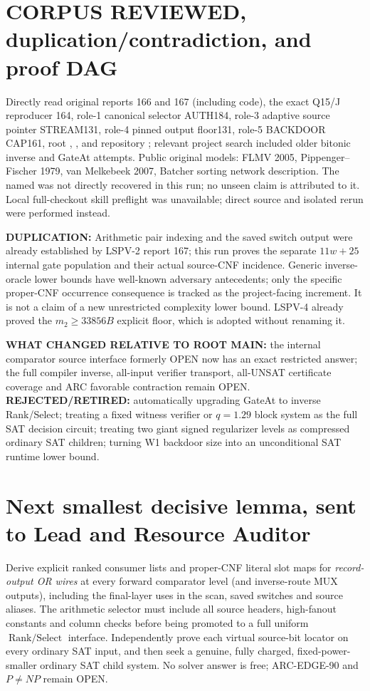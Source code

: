\documentclass[11pt]{article}
\begin{document}
\section{CORPUS REVIEWED, duplication/contradiction, and proof DAG}
Directly read original reports 166 and 167 (including code), the exact Q15/J reproducer 164, role-1 canonical selector AUTH184, role-3 adaptive source pointer STREAM131, role-4 pinned output floor131, role-5 BACKDOOR CAP161, root , ,  and repository ; relevant project search included older bitonic inverse and GateAt attempts. Public original models: FLMV 2005, Pippenger--Fischer 1979, van Melkebeek 2007, Batcher sorting network description. The named  was not directly recovered in this run; no unseen claim is attributed to it. Local full-checkout skill preflight was unavailable; direct source and isolated rerun were performed instead.

\textbf{DUPLICATION:} Arithmetic pair indexing and the saved switch output were already established by LSPV-2 report 167; this run proves the separate $11w+25$ internal gate population and their actual source-CNF incidence. Generic inverse-oracle lower bounds have well-known adversary antecedents; only the specific proper-CNF occurrence consequence is tracked as the project-facing increment. It is not a claim of a new unrestricted complexity lower bound. LSPV-4 already proved the $m_2\ge33856B$ explicit floor, which is adopted without renaming it.

\textbf{WHAT CHANGED RELATIVE TO ROOT MAIN:} the internal comparator source interface formerly OPEN now has an exact restricted answer; the full compiler inverse, all-input verifier transport, all-UNSAT certificate coverage and ARC favorable contraction remain OPEN. \textbf{REJECTED/RETIRED:} automatically upgrading GateAt to inverse Rank/Select; treating a fixed witness verifier or $q=1.29$ block system as the full SAT decision circuit; treating two giant signed regularizer levels as compressed ordinary SAT children; turning W1 backdoor size into an unconditional SAT runtime lower bound.

\section{Next smallest decisive lemma, sent to Lead and Resource Auditor}
Derive explicit ranked consumer lists and proper-CNF literal slot maps for \emph{record-output OR wires} at every forward comparator level (and inverse-route MUX outputs), including the final-layer uses in the scan, saved switches and source aliases. The arithmetic selector must include all source headers, high-fanout constants and column checks before being promoted to a full uniform $\operatorname{Rank/Select}$ interface. Independently prove each virtual source-bit locator on every ordinary SAT input, and then seek a genuine, fully charged, fixed-power-smaller ordinary SAT child system. No solver answer is free; ARC-EDGE-90 and $P\ne NP$ remain OPEN.
\end{document}
